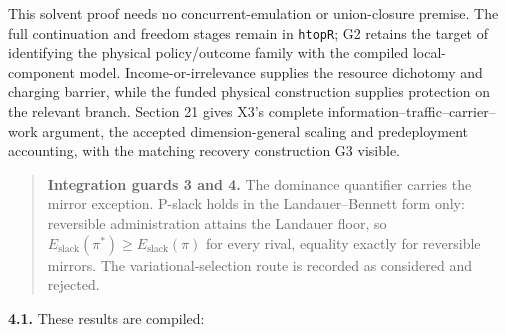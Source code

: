 \documentclass[
]{article}
\begin{document}
This solvent proof needs no concurrent-emulation or union-closure
premise. The full continuation and freedom stages remain in
\texttt{htopR}; G2 retains the target of identifying the physical
policy/outcome family with the compiled local-component model.
Income-or-irrelevance supplies the resource dichotomy and charging
barrier, while the funded physical construction supplies protection on
the relevant branch. Section 21 gives X3's complete
information--traffic--carrier--work argument, the accepted
dimension-general scaling and predeployment accounting, with the
matching recovery construction G3 visible.

\begin{quote}
\textbf{Integration guards 3 and 4.} The dominance quantifier carries
the mirror exception. P-slack holds in the Landauer--Bennett form only:
reversible administration attains the Landauer floor, so
\(E_{\mathrm{slack}}(\pi^*)\ge E_{\mathrm{slack}}(\pi)\) for every
rival, equality exactly for reversible mirrors. The
variational-selection route is recorded as considered and rejected.
\end{quote}

\textbf{4.1.} These results are compiled:
\end{document}
